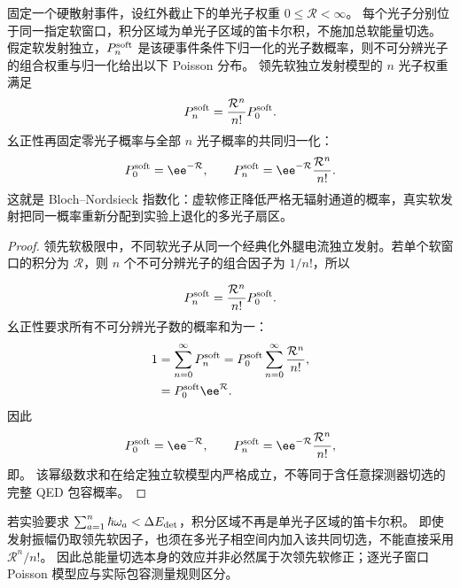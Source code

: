 \begin{proposition}[独立软发射权重的指数归一化]
固定一个硬散射事件，设红外截止下的单光子权重 $0\le\mathcal R<\infty$。
每个光子分别位于同一指定软窗口，积分区域为单光子区域的笛卡尔积，不施加总软能量切选。
假定软发射独立，$P_n^{\rm soft}$ 是该硬事件条件下归一化的光子数概率，则不可分辨光子的组合权重与归一化给出以下 Poisson 分布。
领先软独立发射模型的 $n$ 光子权重满足
\begin{equation}
 {
 P_n^{\rm soft}=\frac{\mathcal R^n}{n!}P_0^{\rm soft}.}
 \label{eq:soft-independent-n-emission-dp68}
\end{equation}
幺正性再固定零光子概率与全部 $n$ 光子概率的共同归一化：
\begin{equation}
 {
 P_0^{\rm soft}=\ee^{-\mathcal R},
 \qquad
 P_n^{\rm soft}
 =\ee^{-\mathcal R}\frac{\mathcal R^n}{n!}.}
 \label{eq:bloch-nordsieck-exponentiation-dp10}
\end{equation}
这就是 Bloch--Nordsieck 指数化：虚软修正降低严格无辐射通道的概率，真实软发射把同一概率重新分配到实验上退化的多光子扇区。
\end{proposition}
\begin{proof}
领先软极限中，不同软光子从同一个经典化外腿电流独立发射。若单个软窗口的积分为 $\mathcal R$，则 $n$ 个不可分辨光子的组合因子为 $1/n!$，所以

\begin{equation*}
 P_n^{\rm soft}=\frac{\mathcal R^n}{n!}P_0^{\rm soft}.
\end{equation*}
幺正性要求所有不可分辨光子数的概率和为一：
\begin{align*}
 1
 &=\sum_{n=0}^{\infty}P_n^{\rm soft}
 =P_0^{\rm soft}\sum_{n=0}^{\infty}\frac{\mathcal R^n}{n!},\\
 &=P_0^{\rm soft}\ee^{\mathcal R}.
\end{align*}
因此
\begin{equation*}
 P_0^{\rm soft}=\ee^{-\mathcal R},
 \qquad
 P_n^{\rm soft}=\ee^{-\mathcal R}\frac{\mathcal R^n}{n!},
\end{equation*}
即。
该幂级数求和在给定独立软模型内严格成立，不等同于含任意探测器切选的完整 QED 包容概率。
\end{proof}

\begin{remark}[总软能量切选与独立性]
若实验要求 $\sum_{a=1}^n\hbar\omega_a<\Delta E_{\rm det}$，积分区域不再是单光子区域的笛卡尔积。
即使发射振幅仍取领先软因子，也须在多光子相空间内加入该共同切选，不能直接采用 $\mathcal R^n/n!$。
因此总能量切选本身的效应并非必然属于次领先软修正；逐光子窗口 Poisson 模型应与实际包容测量规则区分。
\end{remark}

